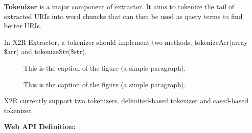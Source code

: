 \documentclass[letterpaper,10pt,english]{sphinxmanual}
\begin{document}
\textbf{Tokenizer} is a major component of extractor. It aims to tokenize the tail of extracted URIs into word chuncks that can then be used as query terms to find better URIs.

In X2R Extractor, a tokenizer should implement two methods, tokenizeArr(array \$arr) and tokenizeStr(\$str).
\begin{figure}[htbp]
\centering
\capstart

\caption{This is the caption of the figure (a simple paragraph).}\end{figure}
\begin{figure}[htbp]
\centering
\capstart

\caption{This is the caption of the figure (a simple paragraph).}\end{figure}

X2R currently support two tokenizers, delimited-based tokenizer and cased-based tokenizer.

\textbf{Web API Definition:}
\end{document}
